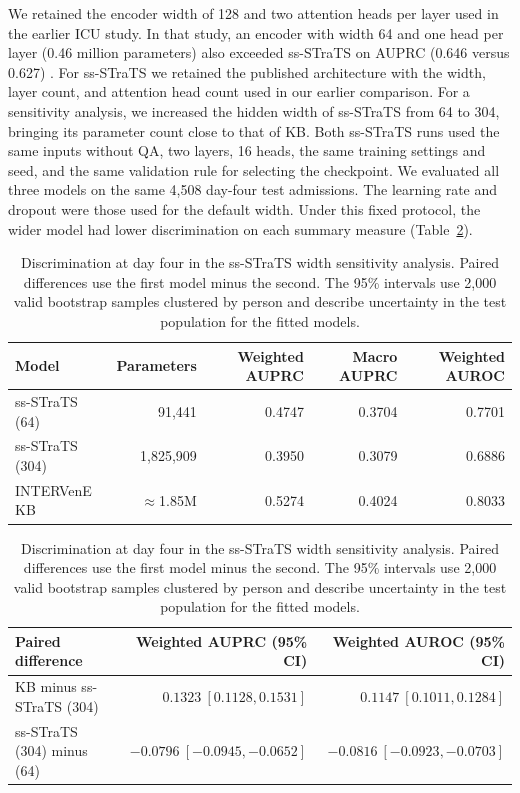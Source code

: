 ﻿\documentclass[11pt,a4paper]{article}
\begin{document}
We retained the encoder width of 128 and two attention heads per layer used in the earlier ICU study. In that study, an encoder with width 64 and one head per layer (0.46 million parameters) also exceeded ss-STraTS on AUPRC (0.646 versus 0.627) \citep{oded2026intervene}. For ss-STraTS we retained the published architecture with the width, layer count, and attention head count used in our earlier comparison. For a sensitivity analysis, we increased the hidden width of ss-STraTS from 64 to 304, bringing its parameter count close to that of KB. Both ss-STraTS runs used the same inputs without QA, two layers, 16 heads, the same training settings and seed, and the same validation rule for selecting the checkpoint. We evaluated all three models on the same 4,508 day-four test admissions. The learning rate and dropout were those used for the default width. Under this fixed protocol, the wider model had lower discrimination on each summary measure (Table~\ref{tab:s-width}).

\begin{table}[htbp]\centering\small
\caption{Discrimination at day four in the ss-STraTS width sensitivity analysis. Paired differences use the first model minus the second. The 95\% intervals use 2,000 valid bootstrap samples clustered by person and describe uncertainty in the test population for the fitted models.}
\label{tab:s-width}
\begin{tabular}{lrrrr}
\toprule
Model & Parameters & Weighted AUPRC & Macro AUPRC & Weighted AUROC \\
\midrule
ss-STraTS (64) & 91,441 & 0.4747 & 0.3704 & 0.7701 \\
ss-STraTS (304) & 1,825,909 & 0.3950 & 0.3079 & 0.6886 \\
INTERVenE KB & $\approx$1.85M & 0.5274 & 0.4024 & 0.8033 \\
\bottomrule
\end{tabular}

\smallskip
\begin{tabular}{lrr}
\toprule
Paired difference & Weighted AUPRC (95\% CI) & Weighted AUROC (95\% CI) \\
\midrule
KB minus ss-STraTS (304) & $0.1323\ [0.1128, 0.1531]$ & $0.1147\ [0.1011, 0.1284]$ \\
ss-STraTS (304) minus (64) & $-0.0796\ [-0.0945, -0.0652]$ & $-0.0816\ [-0.0923, -0.0703]$ \\
\bottomrule
\end{tabular}
\end{table}
\end{document}
